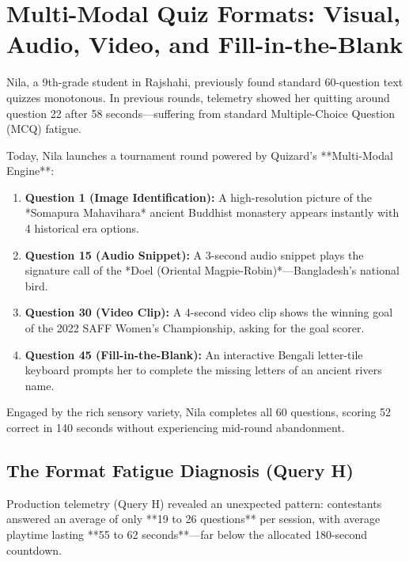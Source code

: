 \chapter{Multi-Modal Quiz Formats: Visual, Audio, Video, and Fill-in-the-Blank}

\begin{tcolorbox}[storybox, title={The Story of Nila's Engaging Multimedia Round}]
Nila, a 9th-grade student in Rajshahi, previously found standard 60-question text quizzes monotonous. In previous rounds, telemetry showed her quitting around question 22 after 58 seconds—suffering from standard Multiple-Choice Question (MCQ) fatigue.

Today, Nila launches a tournament round powered by Quizard's **Multi-Modal Engine**:
\begin{enumerate}
    \item \textbf{Question 1 (Image Identification):} A high-resolution picture of the *Somapura Mahavihara* ancient Buddhist monastery appears instantly with 4 historical era options.
    \item \textbf{Question 15 (Audio Snippet):} A 3-second audio snippet plays the signature call of the *Doel (Oriental Magpie-Robin)*—Bangladesh's national bird.
    \item \textbf{Question 30 (Video Clip):} A 4-second video clip shows the winning goal of the 2022 SAFF Women's Championship, asking for the goal scorer.
    \item \textbf{Question 45 (Fill-in-the-Blank):} An interactive Bengali letter-tile keyboard prompts her to complete the missing letters of an ancient rivers name.
\end{enumerate}
Engaged by the rich sensory variety, Nila completes all 60 questions, scoring 52 correct in 140 seconds without experiencing mid-round abandonment.
\end{tcolorbox}

\section{The Format Fatigue Diagnosis (Query H)}
Production telemetry (Query H) revealed an unexpected pattern: contestants answered an average of only **19 to 26 questions** per session, with average playtime lasting **55 to 62 seconds**—far below the allocated 180-second countdown.

